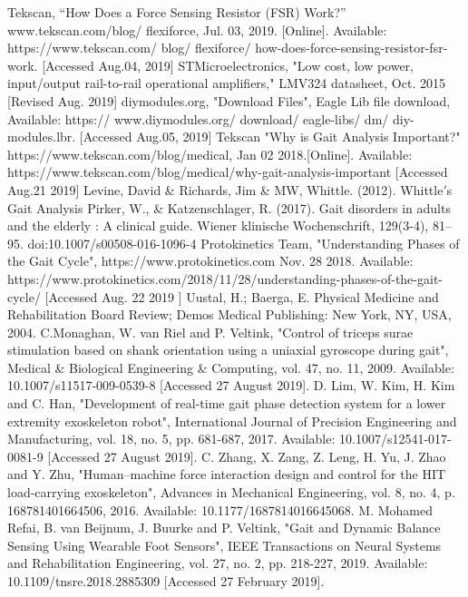 \documentclass[12 pt, a4paper]{thesis}
\begin{document}
\begin{thebibliography}{99}
Tekscan, “How Does a Force Sensing Resistor (FSR) Work?” www.tekscan.com/blog/ flexiforce, Jul. 03, 2019. [Online]. Available: https://www.tekscan.com/ blog/ flexiforce/ how-does-force-sensing-resistor-fsr-work. [Accessed Aug.04, 2019]
STMicroelectronics, "Low cost, low power, input/output rail-to-rail operational amplifiers," LMV324 datasheet, Oct. 2015 [Revised Aug. 2019]
diymodules.org, "Download Files", Eagle Lib file download, Available: https:// www.diymodules.org/ download/ eagle-libs/ dm/ diy-modules.lbr. [Accessed Aug.05, 2019]
Tekscan "Why is Gait Analysis Important?" https://www.tekscan.com/blog/medical, Jan 02 2018.[Online]. Available: https://www.tekscan.com/blog/medical/why-gait-analysis-important [Accessed Aug.21 2019]
Levine, David \& Richards, Jim \& MW, Whittle. (2012). Whittle$'$s Gait Analysis
Pirker, W., \& Katzenschlager, R. (2017). Gait disorders in adults and the elderly : A clinical guide. Wiener klinische Wochenschrift, 129(3-4), 81–95. doi:10.1007/s00508-016-1096-4
Protokinetics Team, "Understanding Phases of the Gait Cycle", https://www.protokinetics.com Nov. 28 2018. Available:  https://www.protokinetics.com/2018/11/28/understanding-phases-of-the-gait-cycle/
[Accessed Aug. 22 2019 ]
Uustal, H.; Baerga, E. Physical Medicine and Rehabilitation Board Review; Demos Medical Publishing: New York, NY, USA, 2004.
C.Monaghan, W. van Riel and P. Veltink, "Control of triceps surae stimulation based on shank orientation using a uniaxial gyroscope during gait", Medical \& Biological Engineering \& Computing, vol. 47, no. 11, 2009. Available: 10.1007/s11517-009-0539-8 [Accessed 27 August 2019].
D. Lim, W. Kim, H. Kim and C. Han, "Development of real-time gait phase detection system for a lower extremity exoskeleton robot", International Journal of Precision Engineering and Manufacturing, vol. 18, no. 5, pp. 681-687, 2017. Available: 10.1007/s12541-017-0081-9 [Accessed 27 August 2019].
C. Zhang, X. Zang, Z. Leng, H. Yu, J. Zhao and Y. Zhu, "Human–machine force interaction design and control for the HIT load-carrying exoskeleton", Advances in Mechanical Engineering, vol. 8, no. 4, p. 168781401664506, 2016. Available: 10.1177/1687814016645068.
M. Mohamed Refai, B. van Beijnum, J. Buurke and P. Veltink, "Gait and Dynamic Balance Sensing Using Wearable Foot Sensors", IEEE Transactions on Neural Systems and Rehabilitation Engineering, vol. 27, no. 2, pp. 218-227, 2019. Available: 10.1109/tnsre.2018.2885309 [Accessed 27 February 2019].

\end{thebibliography}
\end{document}

